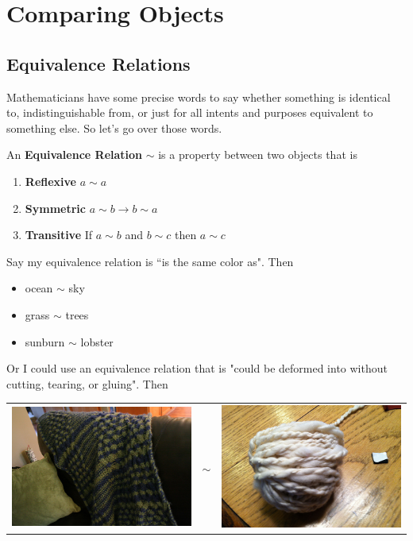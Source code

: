 \chapter{Comparing Objects}\label{sec:comp}

\section{Equivalence Relations}

Mathematicians have some precise words to say whether something is identical to, indistinguishable from, or just for all intents and purposes equivalent to something else.  So let's go over those words.

\begin{definition}
  An \textbf{Equivalence Relation} $ \sim $ is a property between two objects that is
  \begin{enumerate}
    \item \textbf{Reflexive} $a \sim a$
    \item \textbf{Symmetric} $a \sim b \rightarrow b \sim a$
    \item \textbf{Transitive} If $a\sim b$ and $b \sim c$ then $a \sim c$
  \end{enumerate}
\end{definition}

Say my equivalence relation is ``is the same color as".  Then
\begin{itemize}
  \item ocean $ \sim $ sky
  \item grass $ \sim $ trees
  \item sunburn $ \sim $ lobster
\end{itemize}

Or I could use an equivalence relation that is "could be deformed into without cutting, tearing, or gluing".  Then

\begin{tabular}{c c c}
\includegraphics[width=.4\textwidth,align=c]{pics/shawl.JPG} & {\fontsize{50}{60}\selectfont $\sim$} & \includegraphics[width=.4\textwidth,align=c]{pics/yarn.JPG} \\
\end{tabular}

